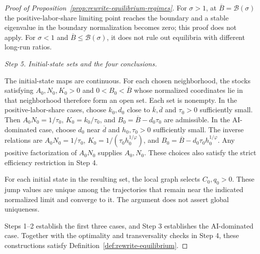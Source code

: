 \begin{proof}[Proof of Proposition~\ref{prop:rewrite-equilibrium-regimes}]
For $\sigma>1$, at $\overline B=\mathcal B(\sigma)$ the positive-labor-share limiting
point reaches the boundary and a stable eigenvalue in the boundary
normalization becomes zero; this proof does not apply. For
$\sigma<1$ and $\overline B\leq\mathcal B(\sigma)$, it does not rule out
equilibria with different long-run ratios.

\par\medskip\noindent\textit{Step 5. Initial-state sets and the four conclusions.}

The initial-state maps are continuous. For each chosen neighborhood,
the stocks satisfying $A_0,N_0,K_0>0$ and $0<B_0<\overline B$ whose
normalized coordinates lie in that neighborhood therefore form an open set.
Each set is nonempty. In the positive-labor-share cases, choose
$k_0,d_0$ close to $\overline k,\overline d$ and $\tau_0>0$
sufficiently small. Then $A_0N_0=1/\tau_0$,
$K_0=k_0/\tau_0$, and $B_0=\overline B-d_0\tau_0$ are admissible.
In the AI-dominated case, choose $d_0$ near $\overline d$ and
$h_0,\tau_0>0$ sufficiently small. The inverse relations are
$A_0N_0=1/\tau_0$, $K_0=1/(\tau_0h_0^{1/\varphi})$, and
$B_0=\overline B-d_0\tau_0h_0^{1/\varphi}$.
Any positive factorization of $A_0N_0$ supplies $A_0,N_0$.
These choices also satisfy the strict efficiency restriction in Step 4.

For each initial state in the resulting set, the local graph selects
$C_0,q_0>0$. These jump values are unique among the trajectories
that remain near the indicated normalized limit and converge to it.
The argument does not assert global uniqueness.

Steps 1--2 establish the first three cases, and Step 3 establishes the
AI-dominated case. Together with the optimality and transversality checks
in Step 4, these constructions satisfy Definition~\ref{def:rewrite-equilibrium}.
\end{proof}


